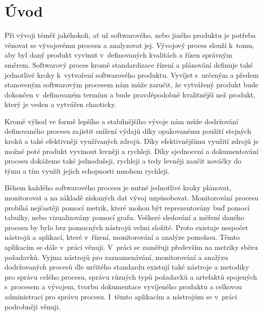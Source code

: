 \documentclass[czech,master]{diploma}
\begin{document}
\MakeTitlePages


\lstlistoflistings

\chapter{Úvod}
\label{sec:Introduction}

Při vývoji téměř jakéhokoli, ať už softwarového, nebo jiného produktu je potřeba věnovat se vývojovému procesu a analyzovat jej. Vývojový proces slouží k~tomu, aby byl daný produkt vyvinut v~definovaných kvalitách a řízen správným směrem. Softwarový proces kromě standardizace řízení a plánování definuje také jednotlivé kroky k~vytvoření softwarového produktu. \cite{ref:sommerrville_sw_process} Vyvíjet s~určeným a předem stanoveným softwarovým procesem nám může zaručit, že vytvářený produkt bude dokončen v~definovaném termínu a bude pravděpodobně kvalitnější než produkt, který je veden a vytvářen chaoticky.

Kromě výhod ve formě lepšího a stabilnějšího vývoje nám může dodržování definovaného procesu zajistit snížení výdajů díky opakovanému použití stejných kroků a také efektivněji využívaných zdrojů. Díky efektivnějšímu využití zdrojů je možné poté produkt vyvinout levněji a rychleji. Díky sjednocení a dokumentování procesu dokážeme také jednodušeji, rychleji a tedy levněji zaučit nováčky do týmu a tím využít jejich schopnosti mnohem rychleji.

Během každého softwarového procesu je nutné jednotlivé kroky plánovat, monitorovat a na základě získaných dat vývoj uzpůsobovat. Monitorování procesu probíhá nejčastěji pomocí metrik, které mohou být reprezentovány buď pomocí tabulky, nebo vizualizovány pomocí grafu. Veškeré sledování a měření daného procesu by bylo bez pomocných nástrojů velmi složité. Proto existuje nespočet nástrojů a aplikací, které v~řízení, monitorování a analýze pomohou. Těmto aplikacím se dále v~práci věnuji. V~práci se zaměřuji především na metriky sběru požadavků. Vyjma nástrojů pro zaznamenávání, monitorování a analýzu dodržovaných procesů dle určitého standardu existují také nástroje a metodiky pro správu celého procesu, správu různých typů požadavků a artefaktů spojených s~procesem a vývojem, tvorbu dokumentace vyvíjeného produktu a celkovou administraci pro správu procesu. I~těmto aplikacím a nástrojům se v~práci podrobněji věnuji. 
\end{document}
